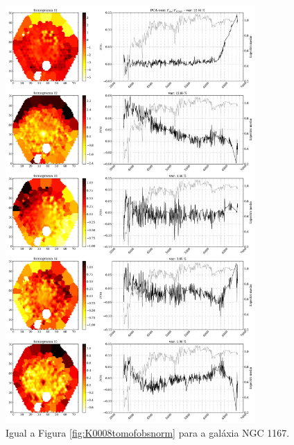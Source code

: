 \begin{figure}
    \includegraphics[width=0.85\textwidth]{figuras/K0119-tomo-obs-norm.pdf}
    \caption[Tomogramas de 1 a 5 para o cubo $F_{obs}$ norm. - NGC 1167.]
    {Igual a Figura \ref{fig:K0008tomofobsnorm} para a galáxia NGC 1167.}
    \label{fig:K0119tomofobsnorm}
\end{figure}

